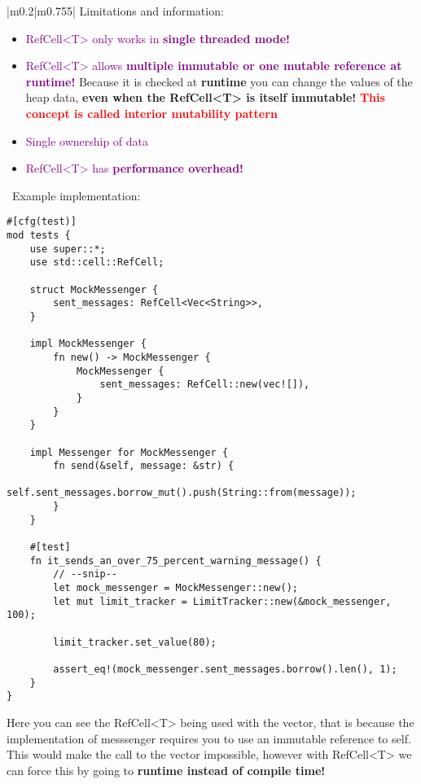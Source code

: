\documentclass[main.tex,fontsize=8pt,paper=a4,paper=portrait,DIV=calc,]{scrartcl}
\begin{document}
\begin{table}[ht!]
\begin{tabular}{|m{0.2\linewidth}|m{0.755\linewidth}|}
Limitations and information:\newline
\begin{itemize}
\item \textcolor{purple}{RefCell<T> only works in \textbf{single threaded mode!}}
\item \textcolor{purple}{RefCell<T> allows \textbf{multiple immutable or one mutable reference at runtime!}}\newline
  Because it is checked at \textbf{runtime} you can change the values of the heap data, \newline
  \textbf{even when the RefCell<T> is itself immutable!}\newline
  \textcolor{red}{\textbf{This concept is called interior mutability pattern}}
\item \textcolor{purple}{Single ownership of data}
\item \textcolor{purple}{RefCell<T> has \textbf{performance overhead!}}
\vspace{-3mm}
\end{itemize}
\, \newline
Example implementation:\newline
\begin{lstlisting}
#[cfg(test)]
mod tests {
    use super::*;
    use std::cell::RefCell;

    struct MockMessenger {
        sent_messages: RefCell<Vec<String>>,
    }

    impl MockMessenger {
        fn new() -> MockMessenger {
            MockMessenger {
                sent_messages: RefCell::new(vec![]),
            }
        }
    }

    impl Messenger for MockMessenger {
        fn send(&self, message: &str) {
            self.sent_messages.borrow_mut().push(String::from(message));
        }
    }

    #[test]
    fn it_sends_an_over_75_percent_warning_message() {
        // --snip--
        let mock_messenger = MockMessenger::new();
        let mut limit_tracker = LimitTracker::new(&mock_messenger, 100);

        limit_tracker.set_value(80);

        assert_eq!(mock_messenger.sent_messages.borrow().len(), 1);
    }
}
\end{lstlisting}
Here you can see the RefCell<T> being used with the vector, that is because the implementation of messsenger requires you to use an immutable reference to self. \newline
This would make the call to the vector impossible, however with RefCell<T> we can force this by going to \textbf{runtime instead of compile time!}\\
\hline
\end{tabular}
\end{table}
\end{document}
